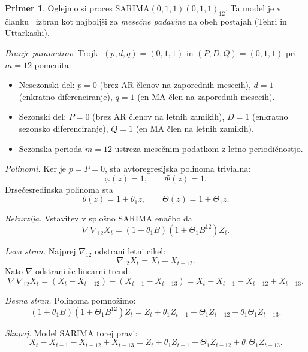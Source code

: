 \documentclass[11pt]{amsart}
\theoremstyle{definition}
\newtheorem{primer}[definicija]{Primer}
\theoremstyle{plain}
\begin{document}
\begin{primer}
    Oglejmo si proces $\mathrm{SARIMA}(0,1,1)(0,1,1)_{12}$. Ta model je v 
    članku~\cite{dimri2020} izbran kot najboljši za \emph{mesečne padavine} na obeh 
    postajah (Tehri in Uttarkashi).

    \emph{Branje parametrov.} Trojki $(p,d,q) = (0,1,1)$ in $(P,D,Q) = (0,1,1)$ pri $m = 12$ 
    pomenita:
    \begin{itemize}
        \item Nesezonski del: $p = 0$ (brez AR členov na zaporednih mesecih), $d = 1$ 
              (enkratno diferenciranje), $q = 1$ (en MA člen na zaporednih mesecih).
        \item Sezonski del: $P = 0$ (brez AR členov na letnih zamikih), $D = 1$ (enkratno 
              sezonsko diferenciranje), $Q = 1$ (en MA člen na letnih zamikih).
        \item Sezonska perioda $m = 12$ ustreza mesečnim podatkom z letno periodičnostjo.
    \end{itemize}

    \emph{Polinomi.} Ker je $p = P = 0$, sta avtoregresijska polinoma trivialna:
    \[
        \varphi(z) = 1, \qquad \Phi(z) = 1.
    \]
    Drsečesredinska polinoma sta
    \[
        \theta(z) = 1 + \theta_1 z, \qquad \Theta(z) = 1 + \Theta_1 z.
    \]

    \emph{Rekurzija.} Vstavitev v splošno SARIMA enačbo da
    \[
        \nabla \, \nabla_{12} X_t = (1 + \theta_1 B)(1 + \Theta_1 B^{12}) Z_t.
    \]

    \emph{Leva stran.} Najprej $\nabla_{12}$ odstrani letni cikel:
    \[
        \nabla_{12} X_t = X_t - X_{t-12}.
    \]
    Nato $\nabla$ odstrani še linearni trend:
    \[
        \nabla \, \nabla_{12} X_t = (X_t - X_{t-12}) - (X_{t-1} - X_{t-13})
                                 = X_t - X_{t-1} - X_{t-12} + X_{t-13}.
    \]

    \emph{Desna stran.} Polinoma pomnožimo:
    \[
        (1 + \theta_1 B)(1 + \Theta_1 B^{12}) Z_t 
        = Z_t + \theta_1 Z_{t-1} + \Theta_1 Z_{t-12} + \theta_1 \Theta_1 Z_{t-13}.
    \]

    \emph{Skupaj.} Model SARIMA torej pravi:
    \[
        X_t - X_{t-1} - X_{t-12} + X_{t-13} 
        = Z_t + \theta_1 Z_{t-1} + \Theta_1 Z_{t-12} + \theta_1 \Theta_1 Z_{t-13}.
    \]
    

\end{primer}
\end{document}
